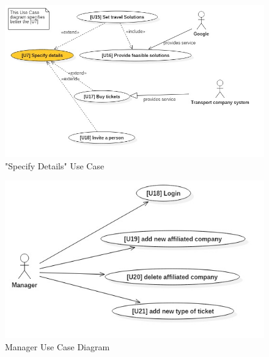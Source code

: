 	\begin{figure}[H]	
	\centerline{\includegraphics[width=\paperwidth-1]{Images/UseCaseDiagram2}}
	\caption{ "Specify Details" Use Case }
\end{figure}

	\begin{figure}[H]	
	\centerline{\includegraphics[scale= 0.7]{Images/UseCaseDiagram3}}
	\caption{Manager Use Case Diagram}
\end{figure}


		\renewcommand{\arraystretch}{1.6} %
		
